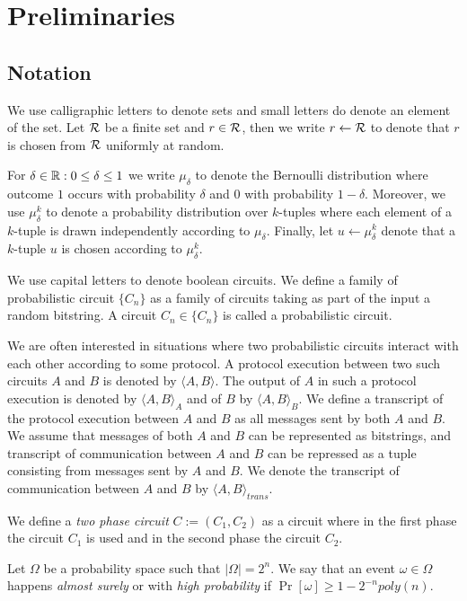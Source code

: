 \chapter{Preliminaries}
\section{Notation}
We use calligraphic letters to denote sets and small letters do denote an element of the set.
Let $\mathcal{R}$ be a finite set and $r \in \mathcal{R}$, then we write $r \leftarrow \mathcal{R}$ to denote that $r$ is chosen from $\mathcal{R}$ uniformly at random.

For $\delta \in \mathbb{R} : 0 \leq \delta \leq 1$ we write $\mu_{\delta}$ to denote the Bernoulli distribution where outcome $1$ occurs with
probability $\delta$ and $0$ with probability $1-\delta$.
Moreover, we use $\mu_{\delta}^k$ to denote a probability distribution over $k$-tuples
where each element of a $k$-tuple is drawn independently according to $\mu_{\delta}$.
Finally, let $u \leftarrow \mu_{\delta}^k$ denote that a $k$-tuple $u$ is chosen according to $\mu_{\delta}^k$.

We use capital letters to denote boolean circuits. We define a family of probabilistic circuit $\{C_n\}$
as a family of circuits taking as part of the input a random bitstring.
A circuit $C_n \in \{C_n\}$ is called a probabilistic circuit.

We are often interested in situations where two probabilistic circuits interact with each other according to some protocol.
A protocol execution between two such circuits $A$ and $B$ is denoted by $\langle A, B \rangle$.
The output of $A$ in such a protocol execution is denoted by $\langle A, B \rangle_A$ and of $B$ by $\langle A, B \rangle_B$.
We define a transcript of the protocol execution between $A$ and $B$ as all messages sent by both $A$ and $B$.
We assume that messages of both $A$ and $B$ can be represented as bitstrings, and transcript of communication between $A$ and $B$
can be repressed as a tuple consisting from messages sent by $A$ and $B$.
We denote the transcript of communication between $A$ and $B$ by $\langle A, B \rangle_{\mathit{trans}}$.

We define a \textit{two phase circuit} $C := (C_1, C_2)$ as a circuit where in the first phase the circuit $C_1$
is used and in the second phase the circuit $C_2$.

Let $\Omega$ be a probability space such that $|\Omega| = 2^{n}$.
We say that an event $\omega \in \Omega$ happens \textit{almost surely} or with \textit{high probability} if
$\Pr[\omega] \geq 1 - 2^{-n} \mathit{poly}(n)$.

